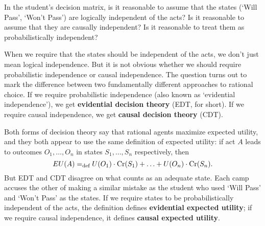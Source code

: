\begin{exercise1}
  In the student's decision matrix, is it reasonable to assume that the
  states (`Will Pass', `Won't Pass') are logically independent of the
  acts? Is it reasonable to assume that they are causally independent?
  Is it reasonable to treat them as probabilistically independent?
\end{exercise1}

When we require that the states should be independent of the acts, we
don't just mean logical independence. But it is not obvious whether we
should require probabilistic independence or causal independence.
The question turns out to mark the difference between two fundamentally
different approaches to rational choice. If we require probabilistic
independence (also known as `evidential independence'), we get
\textbf{evidential decision theory} (EDT, for short). If we require causal
independence, we get \textbf{causal decision theory} (CDT).

Both forms of decision theory say that rational agents maximize
expected utility, and they both appear to use the same definition of
expected utility: if act $A$ leads to outcomes $O_1,\ldots,O_n$
in states $S_1,\ldots,S_n$ respectively, then
\[
EU(A) =_\text{def} U(O_1) \cdot \text{Cr}(S_1) + \ldots + U(O_n) \cdot \text{Cr}(S_n).
\]
But EDT and CDT disagree on what counts as an adequate state. Each
camp accuses the other of making a similar mistake as the student who
used `Will Pass' and `Won't Pass' as the states. If we require states
to be probabilistically independent of the acts, the definition
defines \textbf{evidential expected utility}; if we require causal
independence, it defines \textbf{causal expected utility}.


